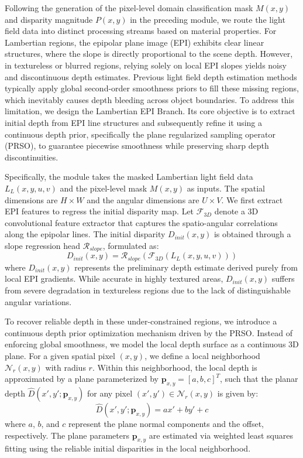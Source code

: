 \documentclass[lettersize,journal]{IEEEtran}
\begin{document}
Following the generation of the pixel-level domain classification mask $M(x,y)$ and disparity magnitude $P(x,y)$ in the preceding module, we route the light field data into distinct processing streams based on material properties. For Lambertian regions, the epipolar plane image (EPI) exhibits clear linear structures, where the slope is directly proportional to the scene depth. However, in textureless or blurred regions, relying solely on local EPI slopes yields noisy and discontinuous depth estimates. Previous light field depth estimation methods typically apply global second-order smoothness priors to fill these missing regions, which inevitably causes depth bleeding across object boundaries. To address this limitation, we design the Lambertian EPI Branch. Its core objective is to extract initial depth from EPI line structures and subsequently refine it using a continuous depth prior, specifically the plane regularized sampling operator (PRSO), to guarantee piecewise smoothness while preserving sharp depth discontinuities.

Specifically, the module takes the masked Lambertian light field data $L_L(x,y,u,v)$ and the pixel-level mask $M(x,y)$ as inputs. The spatial dimensions are $H \times W$ and the angular dimensions are $U \times V$. We first extract EPI features to regress the initial disparity map. Let $\mathcal{F}_{3D}$ denote a 3D convolutional feature extractor that captures the spatio-angular correlations along the epipolar lines. The initial disparity $D_{init}(x,y)$ is obtained through a slope regression head $\mathcal{R}_{slope}$, formulated as:
\begin{equation} \label{eq:ch3_8}
D_{init}(x,y) = \mathcal{R}_{slope}(\mathcal{F}_{3D}(L_L(x,y,u,v)))
\end{equation}
where $D_{init}(x,y)$ represents the preliminary depth estimate derived purely from local EPI gradients. While accurate in highly textured areas, $D_{init}(x,y)$ suffers from severe degradation in textureless regions due to the lack of distinguishable angular variations.

To recover reliable depth in these under-constrained regions, we introduce a continuous depth prior optimization mechanism driven by the PRSO. Instead of enforcing global smoothness, we model the local depth surface as a continuous 3D plane. For a given spatial pixel $(x,y)$, we define a local neighborhood $\mathcal{N}_r(x,y)$ with radius $r$. Within this neighborhood, the local depth is approximated by a plane parameterized by $\mathbf{p}_{x,y} = [a, b, c]^T$, such that the planar depth $\hat{D}(x',y'; \mathbf{p}_{x,y})$ for any pixel $(x',y') \in \mathcal{N}_r(x,y)$ is given by:
\begin{equation} \label{eq:ch3_9}
\hat{D}(x',y'; \mathbf{p}_{x,y}) = a x' + b y' + c
\end{equation}
where $a$, $b$, and $c$ represent the plane normal components and the offset, respectively. The plane parameters $\mathbf{p}_{x,y}$ are estimated via weighted least squares fitting using the reliable initial disparities in the local neighborhood.
\end{document}
